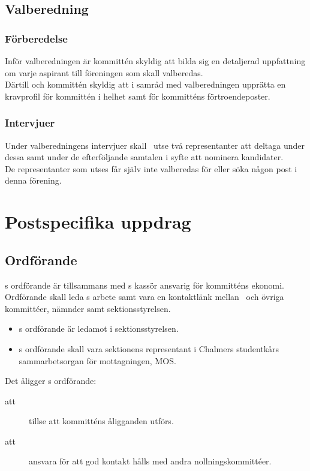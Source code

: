\subsection{Valberedning}
\subsubsection{Förberedelse}
Inför valberedningen är kommittén skyldig att bilda sig en detaljerad uppfattning om varje aspirant till föreningen som skall valberedas.\\
Därtill och kommittén skyldig att i samråd med valberedningen upprätta en kravprofil för kommittén i helhet samt för kommitténs förtroendeposter.

\subsubsection{Intervjuer}
Under valberedningens intervjuer skall \forening \ utse två representanter att deltaga under dessa samt under de efterföljande samtalen i syfte att nominera kandidater.\\
De representanter som utses får själv inte valberedas för eller söka någon post i denna förening.

\section{Postspecifika uppdrag}

\subsection{Ordförande}
\forening s ordförande är tillsammans med \forening s kassör ansvarig för kommitténs ekonomi. Ordförande skall leda \forening s arbete samt vara en kontaktlänk mellan \forening \ och övriga kommittéer, nämnder samt sektionsstyrelsen. 

\begin{itemize}

\item \forening s ordförande är ledamot i sektionsstyrelsen.

\item \forening s ordförande skall vara sektionens representant i Chalmers studentkårs sammarbetsorgan för mottagningen, MOS.
\end{itemize}


Det åligger \forening s ordförande:
\begin{description}

\item[att] tillse att kommitténs åligganden utförs.

\item[att] ansvara för att god kontakt hålls med andra nollningskommittéer.

\end{description}

